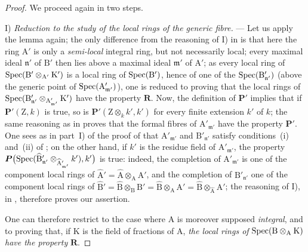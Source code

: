 \begin{proof}
We proceed again in two steps.

I) \emph{Reduction to the study of the local rings of the generic fibre.} --- Let us apply the lemma  again; the only difference from the reasoning of I) in  is that here the ring $\mathrm{A}'$ is only a \emph{semi-local} integral ring, but not necessarily local; every maximal ideal $\mathfrak{n}'$ of $\mathrm{B}'$ then lies above a maximal ideal $\mathfrak{m}'$ of $\mathrm{A}'$; as every local ring of $\operatorname{Spec}(\mathrm{B}'\otimes_{\mathrm{A}'}\mathrm{K}')$ is a local ring of $\operatorname{Spec}(\mathrm{B}')$, hence of one of the $\operatorname{Spec}(\mathrm{B}'_{\mathfrak{n}'})$ (above the generic point of $\operatorname{Spec}(\mathrm{A}'_{\mathfrak{m}'})$), one is reduced to proving that the local rings of $\operatorname{Spec}(\mathrm{B}'_{\mathfrak{n}'}\otimes_{\mathrm{A}'_{\mathfrak{m}'}}\mathrm{K}')$
have the property $\boldsymbol{R}$. Now, the definition of $\boldsymbol{P}'$ implies that if $\boldsymbol{P}'(\mathrm{Z},k)$ is true, so is $\boldsymbol{P}'(\mathrm{Z}\otimes_k k',k')$ for every finite extension $k'$ of $k$; the same reasoning as in  proves that the formal fibres of $\mathrm{A}'_{\mathfrak{m}'}$ have the property $\boldsymbol{P}'$. One sees as in part~I) of the proof of  that $\mathrm{A}'_{\mathfrak{m}'}$ and $\mathrm{B}'_{\mathfrak{n}'}$ satisfy conditions~(i) and~(ii) of ; on the other hand, if $k'$ is the residue field of $\mathrm{A}'_{\mathfrak{m}'}$, the property $\boldsymbol{P}\bigl(\operatorname{Spec}(\widehat{\mathrm{B}}'_{\mathfrak{n}'}\otimes_{\widehat{\mathrm{A}}'_{\mathfrak{m}'}}k'),k'\bigr)$
is true: indeed, the completion of $\mathrm{A}'_{\mathfrak{m}'}$ is one of the component local rings of $\widehat{\mathrm{A}}'=\widehat{\mathrm{A}}\otimes_\mathrm{A}\mathrm{A}'$, and the completion of $\mathrm{B}'_{\mathfrak{n}'}$ one of the component local rings of $\widehat{\mathrm{B}}'=\widehat{\mathrm{B}}\otimes_\mathrm{B}\mathrm{B}'
=\widehat{\mathrm{B}}\otimes_\mathrm{A}\mathrm{A}'
=\widehat{\mathrm{B}}\otimes_{\widehat{\mathrm{A}}}\widehat{\mathrm{A}}'$;
the reasoning of I), in , therefore proves our assertion.

One can therefore restrict to the case where $\mathrm{A}$ is moreover supposed \emph{integral}, and to proving that, if $\mathrm{K}$ is the field of fractions of $\mathrm{A}$, \emph{the local rings of} $\operatorname{Spec}(\mathrm{B}\otimes_\mathrm{A}\mathrm{K})$ \emph{have the property} $\boldsymbol{R}$.


\end{proof}

